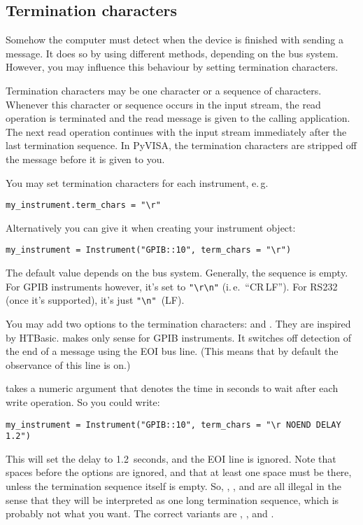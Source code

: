 \documentclass{howto}
\begin{document}
\subsection{Termination characters}
\label{sec:termchars}

Somehow the computer must detect when the device is finished with sending a
message.  It does so by using different methods, depending on the bus system.
However, you may influence this behaviour by setting termination characters.

Termination characters may be one character or a sequence of characters.
Whenever this character or sequence occurs in the input stream, the read
operation is terminated and the read message is given to the calling
application.  The next read operation continues with the input stream
immediately after the last termination sequence.  In PyVISA, the termination
characters are stripped off the message before it is given to you.

You may set termination characters for each instrument, e.\,g.
\begin{verbatim}
my_instrument.term_chars = "\r"
\end{verbatim}
Alternatively you can give it when creating your instrument object:
\begin{verbatim}
my_instrument = Instrument("GPIB::10", term_chars = "\r")
\end{verbatim}
The default value depends on the bus system.  Generally, the sequence is empty.
For GPIB instruments however, it's set to \verb|"\r\n"| (i.\,e.~``CR\,LF'')\@.
For RS232 (once it's supported), it's just \verb|"\n"|~(LF)\@.

You may add two options to the termination characters:  and
.  They are inspired by HTBasic.   makes only sense for
GPIB instruments.  It switches off detection of the end of a message using the
EOI bus line.  (This means that by default the observance of this line is on.)

 takes a numeric argument that denotes the time in seconds to wait
after each write operation.  So you could write:
\begin{verbatim}
my_instrument = Instrument("GPIB::10", term_chars = "\r NOEND DELAY 1.2")
\end{verbatim}
This will set the delay to 1.2~seconds, and the EOI line is ignored.  Note that
spaces before the options are ignored, and that at least one space must be
there, unless the termination sequence itself is empty.  So, , , and  are all illegal in the sense
that they will be interpreted as one long termination sequence, which is
probably not what you want.  The correct variants are ,
, and .
\end{document}

